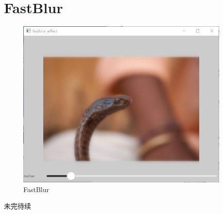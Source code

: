 ﻿




\FloatBarrier
\section{
FastBlur
}\label{c000015s000016}


\begin{figure}[htb] %
\marginnote{\setlength\fboxsep{2pt}\fbox{\footnotesize{\kaishu\figurename\,}\footnotesize{\ref{p000032}}}}\centering %
\includegraphics[width=0.95\textwidth]{../chapter06/fastblur_effect/the_app.png} %
\caption{FastBlur} %
\label{p000032} %
\end{figure}


未完待续









